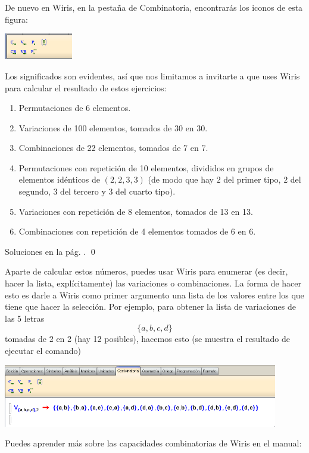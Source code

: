 \documentclass[10pt,a4paper]{article}\usepackage[]{graphicx}\usepackage[]{color}
\newcounter {cont01}
\begin{document}
De nuevo en Wiris,  en la pestaña de Combinatoria, encontrarás los iconos de esta figura:
    \begin{center}
    \includegraphics[width=3cm]{../fig/Tut05-01.png}
    \end{center}
Los significados son evidentes, así que nos limitamos a invitarte  a que uses Wiris para calcular
el resultado de estos ejercicios:
\begin{ejercicio}
\label{tut03:ejercicio14}
\quad
\begin{enumerate}
  \item Permutaciones de 6 elementos.
  \item Variaciones de 100 elementos, tomados de 30 en 30.
  \item Combinaciones de 22 elementos, tomados de 7 en 7.
  \item Permutaciones con repetición de 10 elementos, divididos en grupos de elementos idénticos de $( 2,2,3,3)$ (de modo que hay $2$ del primer tipo, $2$ del segundo, $3$ del tercero y $3$ del cuarto tipo).
  \item Variaciones con repetición de 8 elementos, tomados de 13 en 13.
  \item Combinaciones con repetición de 4 elementos tomados de 6 en 6.
\end{enumerate}
Soluciones en la pág. \pageref{tut03:ejercicio14:sol}.
\qed
\end{ejercicio}
Aparte de calcular estos números, puedes usar Wiris para enumerar (es decir, hacer la lista, explícitamente) las variaciones o combinaciones. La forma de hacer esto es darle a Wiris como primer argumento una lista de los valores entre los que tiene que hacer la selección. Por ejemplo, para obtener la lista de variaciones de las 5 letras
\[\{a, b, c, d\}\]
tomadas de 2 en 2 (hay 12 posibles), hacemos esto (se muestra el resultado de ejecutar el comando)
    \begin{center}
    \includegraphics[width=12cm]{../fig/Tut05-07.png}
    \end{center}
Puedes aprender más sobre las capacidades combinatorias de Wiris en el manual:
\begin{center}
\end{center}
\end{document}
